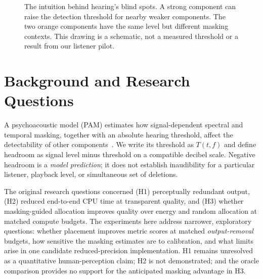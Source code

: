 \documentclass[11pt,a4paper]{article}
\begin{document}
\begin{figure}[tbp]

\caption{The intuition behind hearing's blind spots. A strong component can raise the detection threshold for nearby weaker components. The two orange components have the same level but different masking contexts. This drawing is a schematic, not a measured threshold or a result from our listener pilot.}
\label{fig:intuition}
\end{figure}


\section{Background and Research Questions}
A psychoacoustic model (PAM) estimates how signal-dependent spectral and temporal masking, together with an absolute hearing threshold, affect the detectability of other components~\cite{iso11172,zwicker2007psychoacoustics,bosi2003introduction}. We write its threshold as $T(t,f)$ and define headroom as signal level minus threshold on a compatible decibel scale. Negative headroom is a \emph{model prediction}; it does not establish inaudibility for a particular listener, playback level, or simultaneous set of deletions.

The original research questions concerned (H1) perceptually redundant output, (H2) reduced end-to-end CPU time at transparent quality, and (H3) whether masking-guided allocation improves quality over energy and random allocation at matched compute budgets. The experiments here address narrower, exploratory questions: whether placement improves metric scores at matched \emph{output-removal} budgets, how sensitive the masking estimates are to calibration, and what limits arise in one candidate reduced-precision implementation. H1 remains unresolved as a quantitative human-perception claim; H2 is not demonstrated; and the oracle comparison provides no support for the anticipated masking advantage in H3.
\end{document}
